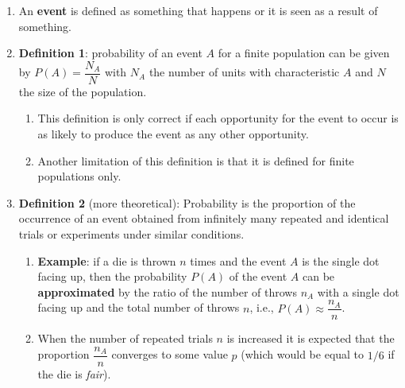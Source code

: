 \begin{enumerate}
    \item An \textbf{event} is defined as something that happens or it is seen as a result of something.
    \hfill \cite{statistics/book/Statistics-for-Data-Scientists/Maurits-Kaptein}

    \item \textbf{Definition 1}: probability of an event $A$ for a finite population can be given by $P(A) = \dfrac{N_A}{N}$ with $N_A$ the number of units with characteristic $A$ and $N$ the size of the population.
    \hfill \cite{statistics/book/Statistics-for-Data-Scientists/Maurits-Kaptein}
    \begin{enumerate}
        \item This definition is only correct if each opportunity for the event to occur is as likely to produce the event as any other opportunity.
        \hfill \cite{statistics/book/Statistics-for-Data-Scientists/Maurits-Kaptein}

        \item Another limitation of this definition is that it is defined for finite populations only.
        \hfill \cite{statistics/book/Statistics-for-Data-Scientists/Maurits-Kaptein}
    \end{enumerate}

    \item \textbf{Definition 2} (more theoretical): Probability is the proportion of the occurrence of an event obtained from infinitely many repeated and identical trials or experiments under similar conditions.
    \hfill \cite{statistics/book/Statistics-for-Data-Scientists/Maurits-Kaptein}
    \begin{enumerate}
        \item \textbf{Example}: if a die is thrown $n$ times and the event $A$ is the single dot facing up, then the probability $P (A)$ of the event $A$ can be \textbf{approximated} by the ratio of the number of throws $n_A$ with a single dot facing up and the total number of throws $n$, i.e., $P(A) \approx \dfrac{n_A}{n}$.
        \hfill \cite{statistics/book/Statistics-for-Data-Scientists/Maurits-Kaptein}

        \item When the number of repeated trials $n$ is increased it is expected that the proportion $\dfrac{n_A}{n}$ converges to some value $p$ (which would be equal to $1/6$ if the die is \textit{fair}).
        \hfill \cite{statistics/book/Statistics-for-Data-Scientists/Maurits-Kaptein}


\end{enumerate}
\end{enumerate}
